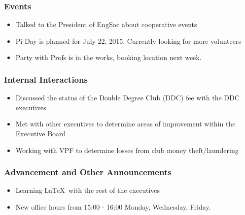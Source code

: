 \subsubsection*{Events}
\begin{itemize}
\item Talked to the President of EngSoc about cooperative events
\item Pi Day is planned for July 22, 2015. Currently looking for more volunteers
\item Party with Profs is in the works, booking location next week.
\end{itemize}

\subsubsection*{Internal Interactions}
\begin{itemize}
\item Discussed the status of the Double Degree Club (DDC) fee with the DDC executives
\item Met with other executives to determine areas of improvement within the Executive Board
\item Working with VPF to determine losses from club money theft/laundering
\end{itemize}

\subsubsection*{Advancement and Other Announcements}
\begin{itemize}
\item Learning \LaTeX\ with the rest of the executives
\item New office hours from 15:00 - 16:00 Monday, Wednesday, Friday. 
\end{itemize}